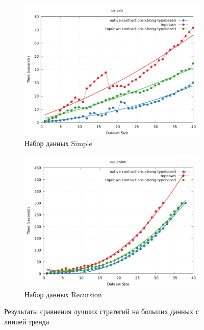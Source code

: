 \documentclass[../diploma.tex]{subfiles}
\begin{document}
\begin{figure}[h]
    \begin{subfigure}{0.5\textwidth}
    \includegraphics[width=\linewidth]{winners_simple.png} 
    \caption{Набор данных Simple}
    \label{plot_winners_simple}
    \end{subfigure}
    \begin{subfigure}{0.5\textwidth}
    \includegraphics[width=\linewidth]{winners_recursion.png}
    \caption{Набор данных Recursion}
    \label{plot_winners_recursion}
    \end{subfigure}
    \caption{Результаты сравнения лучших стратегий на больших данных с линией тренда}
    \label{plot_winners}
\end{figure}
\end{document}
